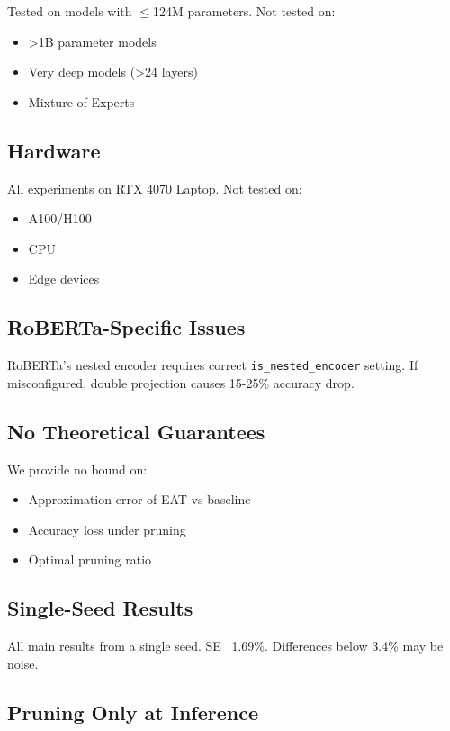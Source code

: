 Tested on models with $\le$124M parameters. Not tested on:

\begin{itemize}
\item \textgreater{}1B parameter models
\item Very deep models (\textgreater{}24 layers)
\item Mixture-of-Experts

\end{itemize}
\subsection{Hardware}

All experiments on RTX 4070 Laptop. Not tested on:

\begin{itemize}
\item A100/H100
\item CPU
\item Edge devices

\end{itemize}
\subsection{RoBERTa-Specific Issues}

RoBERTa's nested encoder requires correct \texttt{is\_nested\_encoder} setting. If 
misconfigured, double projection causes 15-25\% accuracy drop.

\subsection{No Theoretical Guarantees}

We provide no bound on:

\begin{itemize}
\item Approximation error of EAT vs baseline
\item Accuracy loss under pruning
\item Optimal pruning ratio

\end{itemize}
\subsection{Single-Seed Results}

All main results from a single seed. SE ~1.69\%. Differences below 3.4\% 
may be noise.

\subsection{Pruning Only at Inference}

